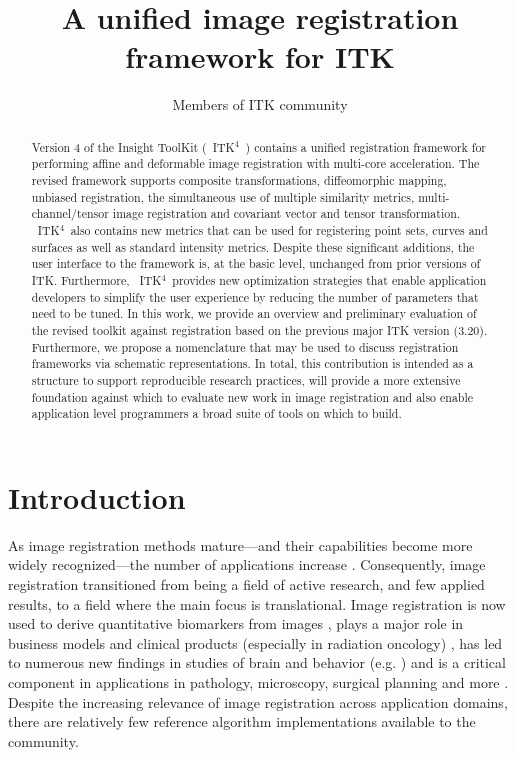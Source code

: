 \documentclass{llncs}
\newcommand{\tk}{~ITK$^{\text{4}}$~}
\begin{document}
\vspace{-0.1in}
\title{A unified image registration framework for ITK}
\author{Members of ITK community}
\maketitle              
\begin{abstract}
Version 4 of the Insight ToolKit (\tk) contains a unified registration
framework for performing affine and deformable image registration with
multi-core acceleration.  The revised framework supports composite
transformations, diffeomorphic mapping, unbiased registration, the
simultaneous use of multiple similarity metrics, multi-channel/tensor
image registration and covariant vector and tensor transformation.
\tk also contains new metrics that can be used for registering point
sets, curves and surfaces as well as standard intensity metrics.
Despite these significant additions, the user interface to the
framework is, at the basic level, unchanged from prior versions of
ITK.  Furthermore, \tk provides new optimization strategies that
enable application developers to simplify the user experience by
reducing the number of parameters that need to be tuned.  In this
work, we provide an overview and preliminary evaluation of the revised
toolkit against registration based on the previous major ITK version
(3.20).  Furthermore, we propose a nomenclature that may be used to
discuss registration frameworks via schematic representations.  In
total, this contribution is intended as a structure to support
reproducible research practices, will provide a more extensive
foundation against which to evaluate new work in image registration
and also enable application level programmers a broad suite of tools
on which to build.
\end{abstract}

\section{Introduction}
As image registration methods mature---and their capabilities become
more widely recognized---the number of applications increase
\cite{Rueckert1999,2004,Shelton2005,Miller2005,Chen2008,Cheung2009,Baloch2009,Peyrat2010,Metz2011,Kikinis2011,Fedorov2011,Murphy2011}.
Consequently, image registration transitioned from being a field of active research, and few applied results, to a
field where the main focus is translational.  Image registration is
now used to derive quantitative biomarkers from images
\cite{Jack2010a}, plays a major role in business models and clinical
products (especially in radiation oncology) \cite{Cheung2009}, has led
to numerous new findings in studies of brain and behavior (e.g. \cite{Bearden2007}) and is a critical component in applications in
pathology, microscopy, surgical planning and more
\cite{Shelton2005,Miller2005,Floca2007,Chen2008,Cheung2009,Peyrat2010,Kikinis2011,Murphy2011}.
Despite the increasing relevance of image registration across
application domains, there are relatively few reference algorithm
implementations available to the community.
\end{document}
